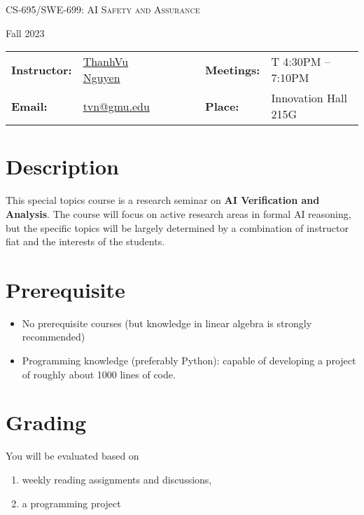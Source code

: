 \documentclass[11pt, a4paper]{article}
\begin{document}
\begin{center}
{\Large \textsc{CS-695/SWE-699: AI Safety and Assurance}}
\end{center}
\begin{center}
Fall 2023
\end{center}

\begin{center}
\begin{minipage}[t]{.75\textwidth}
\begin{tabular}{llcccll}
\toprule
\textbf{Instructor:} & \href{https://go.gmu.edu/tvn}{ThanhVu Nguyen} & & &  & \textbf{Meetings:} & T 4:30PM -- 7:10PM \\
\textbf{Email:} &  \href{mailto:tvn@gmu.edu}{tvn@gmu.edu} & & & & \textbf{Place:} & Innovation Hall 215G\\
\bottomrule
\end{tabular}
\end{minipage}
\end{center}


\section*{Description}
This special topics course is a research seminar on \textbf{\textbf{AI Verification and Analysis}}.
The course will focus on active research areas in formal AI reasoning,
but the specific topics will be largely determined by a
combination of instructor fiat and the interests of the students.

\section*{Prerequisite}
\begin{itemize}
\item No prerequisite courses (but knowledge in linear algebra is strongly recommended)
\item Programming knowledge (preferably Python): capable of developing a project of roughly about 1000 lines of code.
\end{itemize}


\section*{Grading}
\label{sec:org74f2a9b}
You will be evaluated based on
\begin{enumerate}
\item weekly reading assignments and discussions,
\item a programming project
\end{enumerate}
\end{document}

